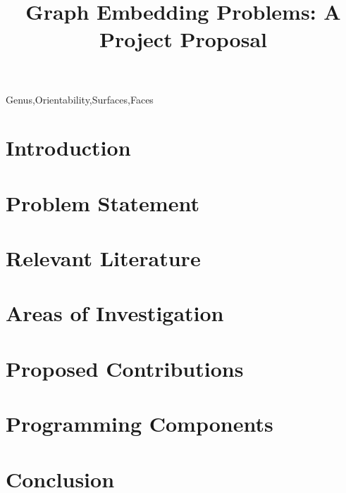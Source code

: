 \documentclass[12pt,conference]{IEEEtran}
\begin{document}
\raggedbottom

\title{Graph Embedding Problems: A Project Proposal}

\author{
}

\maketitle

\begin{abstract}

\end{abstract}

\begin{IEEEkeywords}
Genus,Orientability,Surfaces,Faces
\end{IEEEkeywords}

\section{Introduction}

\section{Problem Statement}

\section{Relevant Literature}

\section{Areas of Investigation}

\section{Proposed Contributions}

\section{Programming Components}

\section{Conclusion}

\begin{thebibliography}{1}
\bibitem{}
\end{thebibliography}
\end{document}
